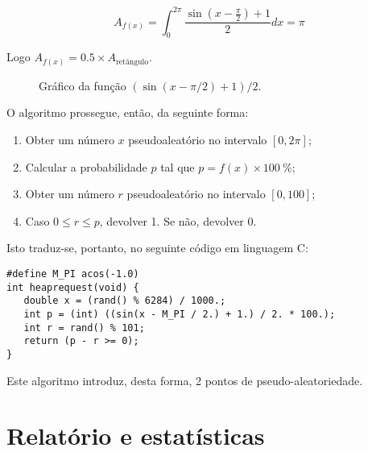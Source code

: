 \documentclass[10pt,oneside]{estiloUBI}
\begin{document}
	\begin{displaymath}
		A_{f(x)} = \int_{0}^{2\pi} \frac{\sin\left(x - \frac{\pi}{2}\right) + 1}{2} dx = \pi
	\end{displaymath}
	
	Logo $A_{f(x)} = 0.5 \times A_{\textrm{retângulo}}$.
	
	\begin{figure}[!htbp]
		\centering
		\caption{Gráfico da função $\left(\sin\left(x - \pi / 2\right) + 1\right) / 2$.}
		\label{graph:heap:request:alg}
	\end{figure}
	
	O algoritmo prossegue, então, da seguinte forma:
	
	\begin{enumerate}
		\item Obter um número $x$ pseudoaleatório no intervalo $[0, 2\pi]$;
		\item Calcular a probabilidade $p$ tal que $p = f(x) \times \SI{100}{\percent}$;
		\item Obter um número $r$ pseudoaleatório no intervalo $[0, 100]$;
		\item Caso $0 \leq r \leq p$, devolver 1. Se não, devolver 0.
	\end{enumerate}

	Isto traduz-se, portanto, no seguinte código em linguagem C:

	\begin{verbatim}
#define M_PI acos(-1.0)
int heaprequest(void) {
   double x = (rand() % 6284) / 1000.;
   int p = (int) ((sin(x - M_PI / 2.) + 1.) / 2. * 100.);
   int r = rand() % 101;
   return (p - r >= 0);
}
	\end{verbatim}
	
	Este algoritmo introduz, desta forma, 2 pontos de pseudo-aleatoriedade.
	
	
	\section{Relatório e estatísticas}
	\label{ssec:heap:stat}
	
\end{document}
